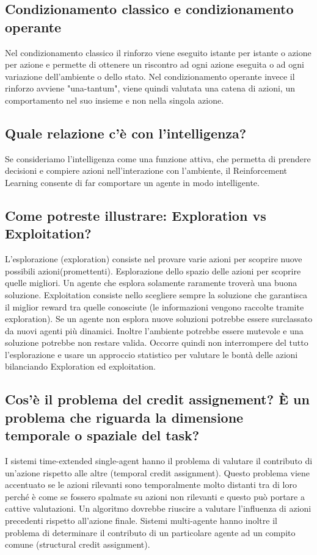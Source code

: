 \documentclass[\main/main.tex]{subfiles}
\begin{document}
\subsection{Condizionamento classico e condizionamento operante}
Nel condizionamento classico il rinforzo viene eseguito istante per istante o azione per azione e permette di ottenere un riscontro ad ogni azione eseguita o ad ogni variazione dell'ambiente o dello stato.
Nel condizionamento operante invece il rinforzo avviene "una-tantum", viene quindi valutata una catena di azioni, un comportamento nel suo insieme e non nella singola azione.

\subsection{Quale relazione c'è con l'intelligenza?}
Se consideriamo l’intelligenza come una funzione attiva, che permetta di prendere decisioni e compiere azioni nell’interazione con l’ambiente, il Reinforcement Learning consente di far comportare un agente in modo intelligente.

\subsection{Come potreste illustrare: Exploration vs Exploitation?}
L'esplorazione (exploration) consiste nel provare varie azioni per scoprire nuove possibili azioni(promettenti). Esplorazione dello spazio delle azioni per scoprire quelle migliori.
Un agente che esplora solamente raramente troverà una buona soluzione.
Exploitation consiste nello scegliere sempre la soluzione che garantisca il miglior reward tra quelle conosciute (le informazioni vengono raccolte tramite exploration).
Se un agente non esplora nuove soluzioni potrebbe essere surclassato da nuovi agenti più dinamici. Inoltre l'ambiente potrebbe essere mutevole e una soluzione potrebbe non restare valida. Occorre quindi non interrompere del tutto l'esplorazione e usare un approccio statistico per valutare le bontà delle azioni bilanciando Exploration ed exploitation.


\subsection{Cos'è il problema del credit assignement? È un problema che riguarda la dimensione temporale o spaziale del task?}
I sistemi time-extended single-agent hanno il problema di valutare il contributo di un'azione rispetto alle altre (temporal credit assignment).
Questo problema viene accentuato se le azioni rilevanti sono temporalmente molto distanti tra di loro perché è come se fossero spalmate su azioni non rilevanti e questo può portare a cattive valutazioni. Un algoritmo dovrebbe riuscire a valutare l'influenza di azioni precedenti rispetto all'azione finale.
Sistemi multi-agente hanno inoltre il problema di determinare il contributo di un particolare agente ad un compito comune (structural credit assignment).
\end{document}
